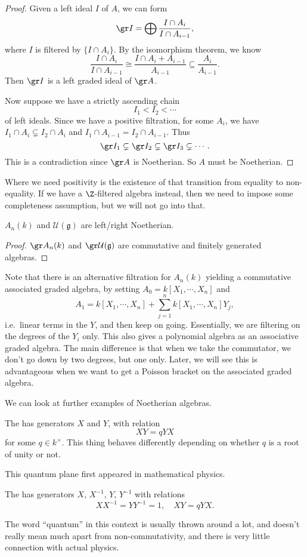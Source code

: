 \documentclass[a4paper]{article}
\begin{document}
\begin{proof}
  Given a left ideal $I$ of $A$, we can form
  \[
    \gr I = \bigoplus \frac{I \cap A_i}{I \cap A_{i - 1}},
  \]
  where $I$ is filtered by $\{I \cap A_i\}$. By the isomorphism theorem, we know
  \[
    \frac{I \cap A_i}{I \cap A_{i - 1}} \cong \frac{I \cap A_i + A_{i - 1}}{A_{i - 1}} \subseteq \frac{A_i}{A_{i - 1}}.
  \]
  Then $\gr I$ is a left graded ideal of $\gr A$.

  Now suppose we have a strictly ascending chain
  \[
    I_1 < I_2 < \cdots
  \]
  of left ideals. Since we have a positive filtration, for some $A_i$, we have $I_1 \cap A_i \subsetneq I_2 \cap A_i$ and $I_1 \cap A_{i - 1} = I_2 \cap A_{i - 1}$. Thus
  \[
    \gr I_1 \subsetneq \gr I_2 \subsetneq \gr I_3 \subsetneq \cdots.
  \]
  This is a contradiction since $\gr A$ is Noetherian. So $A$ must be Noetherian.
\end{proof}
Where we need positivity is the existence of that transition from equality to non-equality. If we have a $\Z$-filtered algebra instead, then we need to impose some completeness assumption, but we will not go into that.

\begin{cor}
  $A_n(k)$ and $\mathcal{U}(\mathfrak{g})$ are left/right Noetherian.
\end{cor}

\begin{proof}
  $\gr A_n(k)$ and $\gr \mathcal{U}(\mathfrak{g})$ are commutative and finitely generated algebras.
\end{proof}

Note that there is an alternative filtration for $A_n(k)$ yielding a commutative associated graded algebra, by setting $A_0 = k[X_1, \cdots, X_n]$ and
\[
  A_1 = k[X_1, \cdots, X_n] + \sum_{j = 1}^n k[X_1, \cdots, X_n] Y_j,
\]
i.e.\ linear terms in the $Y$, and then keep on going. Essentially, we are filtering on the degrees of the $Y_i$ only. This also gives a polynomial algebra as an associative graded algebra. The main difference is that when we take the commutator, we don't go down by two degrees, but one only. Later, we will see this is advantageous when we want to get a Poisson bracket on the associated graded algebra.

We can look at further examples of Noetherian algebras.
\begin{eg}
  The   has generators $X$ and $Y$, with relation
  \[
    XY = q YX
  \]
  for some $q \in k^\times$. This thing behaves differently depending on whether $q$ is a root of unity or not.
\end{eg}
This quantum plane first appeared in mathematical physics.
\begin{eg}
  The   has generators $X$, $X^{-1}$, $Y$, $Y^{-1}$ with relations
  \[
    XX^{-1} = YY^{-1} = 1,\quad XY = q YX.
  \]
\end{eg}
The word ``quantum'' in this context is usually thrown around a lot, and doesn't really mean much apart from non-commutativity, and there is very little connection with actual physics.
\end{document}
